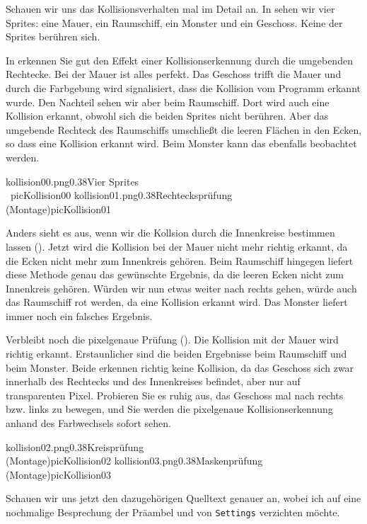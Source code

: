 Schauen wir uns das Kollisionsverhalten mal im Detail an. In  sehen wir vier Sprites: eine Mauer, ein Raumschiff, ein Monster und ein Geschoss. Keine der Sprites berühren sich.


In  erkennen Sie gut den Effekt einer Kollisionserkennung durch die umgebenden Rechtecke. Bei der Mauer ist alles perfekt. Das Geschoss trifft die Mauer und durch die Farbgebung wird signalisiert, dass die Kollision vom Programm erkannt wurde. Den Nachteil sehen wir aber beim Raumschiff. Dort wird auch eine Kollision erkannt, obwohl sich die beiden Sprites nicht berühren. Aber das umgebende Rechteck des Raumschiffs umschließt die leeren Flächen in den Ecken, so dass eine Kollision erkannt wird. Beim Monster kann das ebenfalls beobachtet werden. 

\myezweihbild%
    {kollision00.png}{0.38}{Vier Sprites\\\ }{picKollision00}%
    {kollision01.png}{0.38}{Rechtecksprüfung\\ (Montage)}{picKollision01}


Anders sieht es aus, wenn wir die Kollsion durch die Innenkreise bestimmen lassen (). Jetzt wird die Kollision bei der Mauer nicht mehr richtig erkannt, da die Ecken nicht mehr zum Innenkreis gehören. Beim Raumschiff hingegen liefert diese Methode genau das gewünschte Ergebnis, da die leeren Ecken nicht zum Innenkreis gehören. Würden wir nun etwas weiter nach rechts gehen, würde auch das Raumschiff rot werden, da eine Kollision erkannt wird. Das Monster liefert immer noch ein falsches Ergebnis.


Verbleibt noch die pixelgenaue Prüfung (). Die Kollision mit der Mauer wird richtig erkannt. Erstaunlicher sind die beiden Ergebnisse beim Raumschiff und beim Monster. Beide erkennen richtig keine Kollision, da das Geschoss sich zwar innerhalb des Rechtecks und des Innenkreises befindet, aber nur auf transparenten Pixel. Probieren Sie es ruhig aus, das Geschoss mal nach rechts bzw. links zu bewegen, und Sie werden die pixelgenaue Kollisionserkennung anhand des Farbwechsels sofort sehen. 

\myezweihbild%
    {kollision02.png}{0.38}{Kreisprüfung\\ (Montage)}{picKollision02}%
    {kollision03.png}{0.38}{Maskenprüfung\\ (Montage)}{picKollision03}

Schauen wir uns jetzt den dazugehörigen Quelltext genauer an, wobei ich auf eine nochmalige Besprechung der Präambel und von \texttt{Settings} verzichten möchte. 

